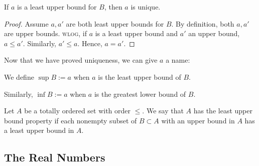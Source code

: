 \begin{lemma}
    If $a$ is a least upper bound for $B$, then $a$ is unique.
\end{lemma}
\begin{proof}
    Assume $a, a'$ are both least upper bounds for $B$. By definition, both $a, a'$ are upper bounds. \textsc{wlog}, if $a$ is a least upper bound and $a'$ an upper bound, $a\leq a'$. Similarly, $a'\leq a$. Hence, $a = a'$.
\end{proof}
Now that we have proved uniqueness, we can give $a$ a name:
\begin{definition}
    We define $\sup B := a$ when $a$ is the least upper bound of $B$.

    Similarly, $\inf B := a$ when $a$ is the greatest lower bound of $B$.
\end{definition}
\begin{definition}
    Let $A$ be a totally ordered set with order $\leq$. We say that $A$ has the least upper bound property if each nonempty subset of $B\subset A$ with an upper bound in $A$ has a least upper bound in $A$.
\end{definition}

\subsection{The Real Numbers}

